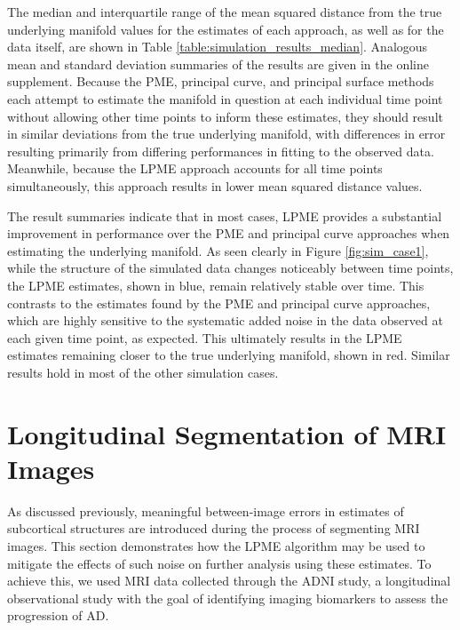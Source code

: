 \documentclass[12pt]{article}
\theoremstyle{definition}
\begin{document}
The median and interquartile range of the mean squared distance from the true underlying manifold values for the estimates of each approach, as well as for the data itself, are shown in Table \ref{table:simulation_results_median}. Analogous mean and standard deviation summaries of the results are given in the online supplement. Because the PME, principal curve, and principal surface methods each attempt to estimate the manifold in question at each individual time point without allowing other time points to inform these estimates, they should result in similar deviations from the true underlying manifold, with differences in error resulting primarily from differing performances in fitting to the observed data. Meanwhile, because the LPME approach accounts for all time points simultaneously, this approach results in lower mean squared distance values.

The result summaries indicate that in most cases, LPME provides a substantial improvement in performance over the PME and principal curve approaches when estimating the underlying manifold. As seen clearly in Figure \ref{fig:sim_case1}, while the structure of the simulated data changes noticeably between time points, the LPME estimates, shown in blue, remain relatively stable over time. This contrasts to the estimates found by the PME and principal curve approaches, which are highly sensitive to the systematic added noise in the data observed at each given time point, as expected. This ultimately results in the LPME estimates remaining closer to the true underlying manifold, shown in red. Similar results hold in most of the other simulation cases.



\section{Longitudinal Segmentation of MRI Images}\label{s:application}

As discussed previously, meaningful between-image errors in estimates of subcortical structures are introduced during the process of segmenting MRI images. This section demonstrates how the LPME algorithm may be used to mitigate the effects of such noise on further analysis using these estimates. To achieve this, we used MRI data collected through the ADNI study, a longitudinal observational study with the goal of identifying imaging biomarkers to assess the progression of AD.
\end{document}
